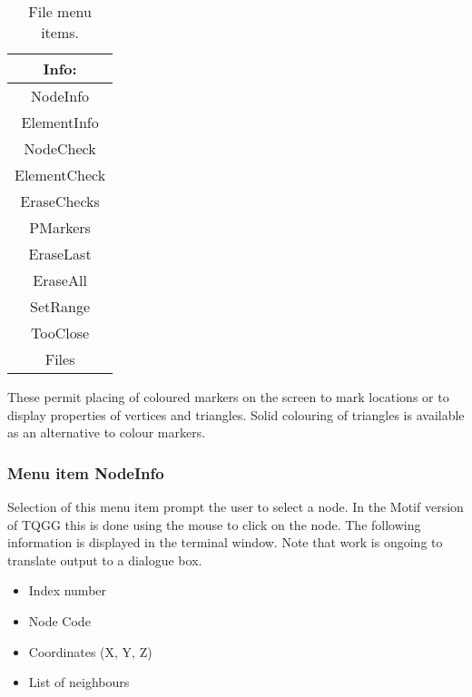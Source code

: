 \documentclass{article}
\begin{document}
\begin{table}[htb!]
 \caption{File menu items.}
  \begin{center}
   \begin{tabular}{|c|}
    \hline
Info:\\     \hline
NodeInfo \\ ElementInfo \\ NodeCheck \\ ElementCheck \\ EraseChecks \\ PMarkers \\ EraseLast \\ EraseAll \\ SetRange \\ TooClose \\ Files \\
    \hline
   \end{tabular}
   \label{tab:INFO}
  \end{center}
\end{table}

These permit placing of coloured markers on the screen to mark locations or to display properties of vertices and triangles. Solid colouring of triangles is available as an alternative to colour markers.


\subsubsection{Menu item NodeInfo}
Selection of this menu item prompt the user to select a node.  In the Motif version of TQGG this is done using the mouse to click on the node.  The following information is displayed in the terminal window.  Note that work is ongoing to translate output to a dialogue box.

\begin{itemize}
\item Index number
\item Node Code
\item Coordinates (X, Y, Z)
\item List of neighbours 
\end{itemize}
\end{document}
